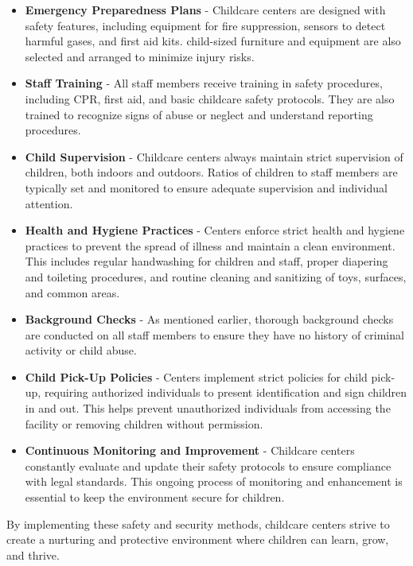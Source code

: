 \begin{itemize}
    \item \textbf{Emergency Preparedness Plans} - Childcare centers are designed with safety features, including equipment for fire suppression, sensors to detect harmful gases, and first aid kits. child-sized furniture and equipment are also selected and arranged to minimize injury risks.
    \item \textbf{Staff Training} - All staff members receive training in safety procedures, including CPR, first aid, and basic childcare safety protocols. They are also trained to recognize signs of abuse or neglect and understand reporting procedures. \cite{Fenech_Sumsion_2007}
    \item \textbf{Child Supervision} - Childcare centers always maintain strict supervision of children, both indoors and outdoors. Ratios of children to staff members are typically set and monitored to ensure adequate supervision and individual attention. 
    \item \textbf{Health and Hygiene Practices} - Centers enforce strict health and hygiene practices to prevent the spread of illness and maintain a clean environment. This includes regular handwashing for children and staff, proper diapering and toileting procedures, and routine cleaning and sanitizing of toys, surfaces, and common areas. 
    \item \textbf{Background Checks} - As mentioned earlier, thorough background checks are conducted on all staff members to ensure they have no history of criminal activity or child abuse. 
    \item \textbf{Child Pick-Up Policies} - Centers implement strict policies for child pick-up, requiring authorized individuals to present identification and sign children in and out. This helps prevent unauthorized individuals from accessing the facility or removing children without permission.
    \item \textbf{Continuous Monitoring and Improvement} - Childcare centers constantly evaluate and update their safety protocols to ensure compliance with legal standards. This ongoing process of monitoring and enhancement is essential to keep the environment secure for children. 
\end{itemize}

By implementing these safety and security methods, childcare centers strive to create a nurturing and protective environment where children can learn, grow, and thrive.